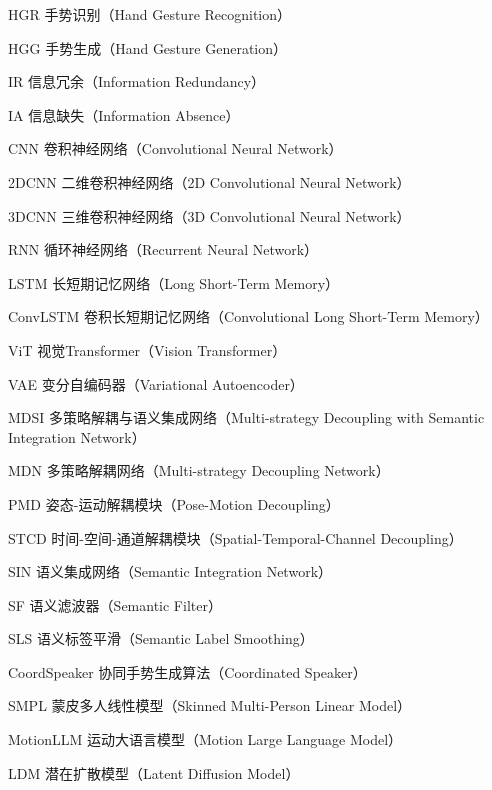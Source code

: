 
\begin{denotation}[3cm]
  \item[HGR] 手势识别（Hand Gesture Recognition）
  \item[HGG] 手势生成（Hand Gesture Generation）
  \item[IR] 信息冗余（Information Redundancy）
  \item[IA] 信息缺失（Information Absence）
  \item[CNN] 卷积神经网络（Convolutional Neural Network）
  \item[2DCNN] 二维卷积神经网络（2D Convolutional Neural Network）
  \item[3DCNN] 三维卷积神经网络（3D Convolutional Neural Network）
  \item[RNN] 循环神经网络（Recurrent Neural Network）
  \item[LSTM] 长短期记忆网络（Long Short-Term Memory）
  \item[ConvLSTM] 卷积长短期记忆网络（Convolutional Long Short-Term Memory）
  \item[ViT] 视觉Transformer（Vision Transformer）
  \item[VAE] 变分自编码器（Variational Autoencoder）
  \item[MDSI] 多策略解耦与语义集成网络（Multi-strategy Decoupling with Semantic Integration Network）
  \item[MDN] 多策略解耦网络（Multi-strategy Decoupling Network）
  \item[PMD] 姿态-运动解耦模块（Pose-Motion Decoupling）
  \item[STCD] 时间-空间-通道解耦模块（Spatial-Temporal-Channel Decoupling）
  \item[SIN] 语义集成网络（Semantic Integration Network）
  \item[SF] 语义滤波器（Semantic Filter）
  \item[SLS] 语义标签平滑（Semantic Label Smoothing）
  \item[CoordSpeaker] 协同手势生成算法（Coordinated Speaker）
  \item[SMPL] 蒙皮多人线性模型（Skinned Multi-Person Linear Model）
  \item[MotionLLM] 运动大语言模型（Motion Large Language Model）
  \item[LDM] 潜在扩散模型（Latent Diffusion Model）
  

\end{denotation}
